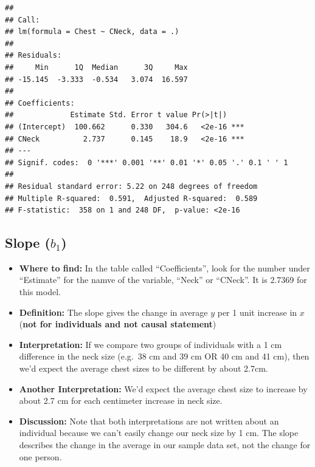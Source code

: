 \documentclass[]{book}
\newenvironment{Shaded}{\begin{snugshade}}{\end{snugshade}}
\newcommand{\DataTypeTok}[1]{\textcolor[rgb]{0.13,0.29,0.53}{#1}}
\newcommand{\KeywordTok}[1]{\textcolor[rgb]{0.13,0.29,0.53}{\textbf{#1}}}
\newcommand{\NormalTok}[1]{#1}
\newcommand{\OperatorTok}[1]{\textcolor[rgb]{0.81,0.36,0.00}{\textbf{#1}}}
\newcommand{\StringTok}[1]{\textcolor[rgb]{0.31,0.60,0.02}{#1}}
\providecommand{\tightlist}{%
  \setlength{\itemsep}{0pt}\setlength{\parskip}{0pt}}
\begin{document}
\begin{Shaded}
\end{Shaded}

\begin{verbatim}
## 
## Call:
## lm(formula = Chest ~ CNeck, data = .)
## 
## Residuals:
##     Min      1Q  Median      3Q     Max 
## -15.145  -3.333  -0.534   3.074  16.597 
## 
## Coefficients:
##             Estimate Std. Error t value Pr(>|t|)    
## (Intercept)  100.662      0.330   304.6   <2e-16 ***
## CNeck          2.737      0.145    18.9   <2e-16 ***
## ---
## Signif. codes:  0 '***' 0.001 '**' 0.01 '*' 0.05 '.' 0.1 ' ' 1
## 
## Residual standard error: 5.22 on 248 degrees of freedom
## Multiple R-squared:  0.591,  Adjusted R-squared:  0.589 
## F-statistic:  358 on 1 and 248 DF,  p-value: <2e-16
\end{verbatim}

\hypertarget{slope-b_1}{%
\subsection{\texorpdfstring{Slope (\(b_1\))}{Slope (b\_1)}}\label{slope-b_1}}

\begin{itemize}
\tightlist
\item
  \textbf{Where to find:} In the table called ``Coefficients'', look for the number under ``Estimate'' for the namve of the variable, ``Neck'' or ``CNeck''. It is 2.7369 for this model.
\item
  \textbf{Definition:} The slope gives the change in average \(y\) per 1 unit increase in \(x\) (\textbf{not for individuals and not causal statement})
\item
  \textbf{Interpretation:} If we compare two groups of individuals with a 1 cm difference in the neck size (e.g.~38 cm and 39 cm OR 40 cm and 41 cm), then we'd expect the average chest sizes to be different by about 2.7cm.
\item
  \textbf{Another Interpretation:} We'd expect the average chest size to increase by about 2.7 cm for each centimeter increase in neck size.
\item
  \textbf{Discussion:} Note that both interpretations are not written about an individual because we can't easily change our neck size by 1 cm. The slope describes the change in the average in our sample data set, not the change for one person.
\end{itemize}
\end{document}

